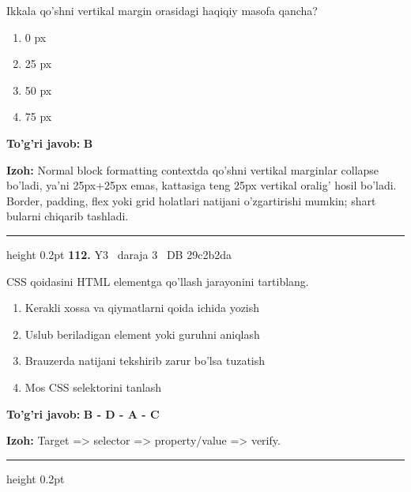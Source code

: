 \documentclass[10pt,a4paper,oneside]{article}
\begin{document}
\par
Ikkala qo'shni vertikal margin orasidagi haqiqiy masofa qancha?
\begin{enumerate}[label=\Alph*),leftmargin=9mm]
\item 0 px
\item 25 px
\item 50 px
\item 75 px
\end{enumerate}
\begin{tcolorbox}[enhanced,breakable,colback=teal!4,colframe=teal!45!black,boxrule=0.45pt,arc=1.2mm,left=2.8mm,right=2.8mm,top=2mm,bottom=2mm,before skip=2mm,after skip=2mm]
\textbf{\color{teal}To'g'ri javob:} \textbf{B}
\par\smallskip
\textbf{Izoh:} Normal block formatting contextda qo'shni vertikal marginlar collapse bo'ladi, ya'ni 25px+25px emas, kattasiga teng 25px vertikal oralig' hosil bo'ladi. Border, padding, flex yoki grid holatlari natijani o'zgartirishi mumkin; shart bularni chiqarib tashladi.
\end{tcolorbox}
\vspace{2mm}\hrule height 0.2pt \vspace{4mm}
\hypertarget{q112}{\textbf{\color{ink}112.}}  {\color{muted}\scriptsize Y3 \textbullet\ daraja 3 \textbullet\ DB 29c2b2da}
\par
CSS qoidasini HTML elementga qo'llash jarayonini tartiblang.
\begin{enumerate}[label=\Alph*),leftmargin=9mm]
\item Kerakli xossa va qiymatlarni qoida ichida yozish
\item Uslub beriladigan element yoki guruhni aniqlash
\item Brauzerda natijani tekshirib zarur bo'lsa tuzatish
\item Mos CSS selektorini tanlash
\end{enumerate}
\begin{tcolorbox}[enhanced,breakable,colback=teal!4,colframe=teal!45!black,boxrule=0.45pt,arc=1.2mm,left=2.8mm,right=2.8mm,top=2mm,bottom=2mm,before skip=2mm,after skip=2mm]
\textbf{\color{teal}To'g'ri javob:} \textbf{B - D - A - C}
\par\smallskip
\textbf{Izoh:} Target =\textgreater{} selector =\textgreater{} property/value =\textgreater{} verify.
\end{tcolorbox}
\vspace{2mm}\hrule height 0.2pt \vspace{4mm}
\end{document}
